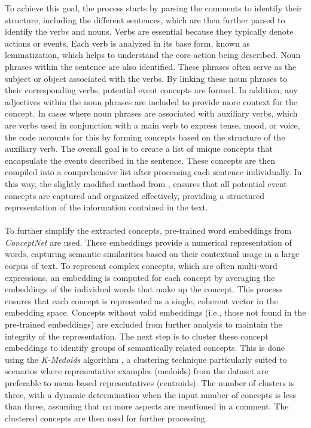 \documentclass[sn-mathphys-num]{sn-jnl}%
\theoremstyle{thmstyleone}%
\theoremstyle{thmstyletwo}%
\theoremstyle{thmstylethree}%
\begin{document}
    To achieve this goal, the process starts by parsing the comments to identify their structure, including the different sentences, which are then further parsed to identify the verbs and nouns. Verbs are essential because they typically denote actions or events. Each verb is analyzed in its base form, known as lemmatization, which helps to understand the core action being described. Noun phrases within the sentence are also identified. These phrases often serve as the subject or object associated with the verbs. By linking these noun phrases to their corresponding verbs, potential event concepts are formed. In addition, any adjectives within the noun phrases are included to provide more context for the concept. In cases where noun phrases are associated with auxiliary verbs, which are verbs used in conjunction with a main verb to express tense, mood, or voice, the code accounts for this by forming concepts based on the structure of the auxiliary verb.
    The overall goal is to create a list of unique concepts that encapsulate the events described in the sentence. These concepts are then compiled into a comprehensive list after processing each sentence individually. In this way, the slightly modified method from \cite{10.1145/2487788.2487995}, ensures that all potential event concepts are captured and organized effectively, providing a structured representation of the information contained in the text.\\\\
    To further simplify the extracted concepts, pre-trained word embeddings from \textit{ConceptNet} are used. These embeddings provide a numerical representation of words, capturing semantic similarities based on their contextual usage in a large corpus of text. To represent complex concepts, which are often multi-word expressions, an embedding is computed for each concept by averaging the embeddings of the individual words that make up the concept. This process ensures that each concept is represented as a single, coherent vector in the embedding space. Concepts without valid embeddings (i.e., those not found in the pre-trained embeddings) are excluded from further analysis to maintain the integrity of the representation. The next step is to cluster these concept embeddings to identify groups of semantically related concepts. This is done using the \textit{K-Medoids} algorithm \cite{PARK20093336}, a clustering technique particularly suited to scenarios where representative examples (medoids) from the dataset are preferable to mean-based representatives (centroids). The number of clusters is three, with a dynamic determination when the input number of concepts is less than three, assuming that no more aspects are mentioned in a comment. The clustered concepts are then used for further processing.\\\\
\end{document}
